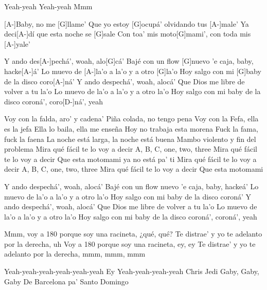 Yeah-yeah
Yeah-yeah
Mmm

[A-]Baby, no me [G]llame'
Que yo estoy [G]ocupá' olvidando tus [A-]male'
Ya deci[A-]dí que esta noche se [G]sale
Con toa' mis moto[G]mami', con toda mis [A-]yale'

Y ando des[A-]pechá', woah, alo[G]cá'
Bajé con un flow [G]nuevo 'e caja, baby, hacke[A-]á'
Lo muevo de [A-]la'o a la'o y a otro [G]la'o
Hoy salgo con mi [G]baby de la disco coro[A-]ná'
Y ando despechá', woah, alocá'
Que Dios me libre de volver a tu la'o
Lo muevo de la'o a la'o y a otro la'o
Hoy salgo con mi baby de la disco coroná', coro[D-]ná', yeah

Voy con la falda, aro' y cadena'
Piña colada, no tengo pena
Voy con la Fefa, ella es la jefa
Ella lo baila, ella me enseña
Hoy no trabaja esta morena
Fuck la fama, fuck la faena
La noche está larga, la noche está buena
Mambo violento y fin del problema
Mira qué fácil te lo voy a decir
A, B, C, one, two, three
Mira qué fácil te lo voy a decir
Que esta motomami ya no está pa' ti
Mira qué fácil te lo voy a decir
A, B, C, one, two, three
Mira qué fácil te lo voy a decir
Que esta motomami

Y ando despechá', woah, alocá'
Bajé con un flow nuevo 'e caja, baby, hackeá'
Lo muevo de la'o a la'o y a otro la'o
Hoy salgo con mi baby de la disco coroná'
Y ando despechá', woah, alocá'
Que Dios me libre de volver a tu la'o
Lo muevo de la'o a la'o y a otro la'o
Hoy salgo con mi baby de la disco coroná', coroná', yeah

Mmm, voy a 180 porque soy una racineta, ¿qué, qué?
Te distrae' y yo te adelanto por la derecha, uh
Voy a 180 porque soy una racineta, ey, ey
Te distrae' y yo te adelanto por la derecha, mmm, mmm, mmm

Yeah-yeah-yeah-yeah-yeah-yeah
Ey
Yeah-yeah-yeah-yeah
Chris Jedi
Gaby, Gaby, Gaby
De Barcelona pa' Santo Domingo
